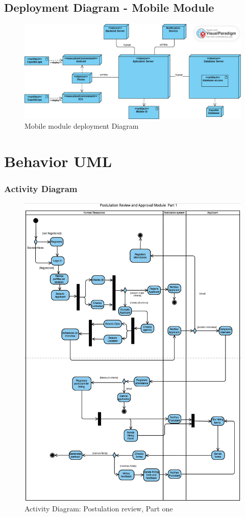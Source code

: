 \documentclass{scrreprt}
\begin{document}
\section{Deployment Diagram - Mobile Module}
\begin{figure}[H]
	\centering  \small
	\includegraphics[width=\textwidth]{DPL/DPL2.jpeg} 
	\caption{Mobile module deployment Diagram}
	\label{fig:DPL2}
\end{figure}
\chapter{Behavior UML}

\subsection{Activity Diagram}
\begin{figure}[H]
	\centering
	\includegraphics[width=\textwidth]{AD/AD1.png}
	\caption{Activity Diagram: Postulation review, Part one}
	\label{fig:AD1}
\end{figure}
\end{document}
